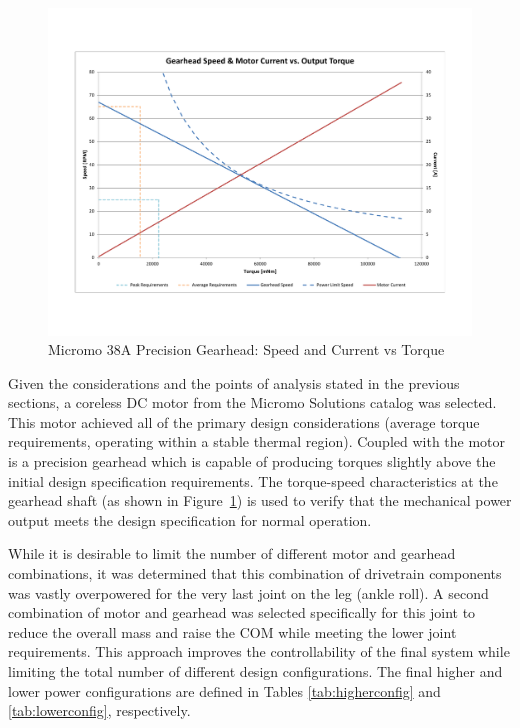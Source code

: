 \begin{figure}[!h]
	\begin{center}
    \includegraphics[trim = 20mm 30mm 20mm 30mm,clip,width=15cm]{fig/design/gearhead1.pdf}
	\end{center}
  \caption{Micromo 38A Precision Gearhead: Speed and Current vs Torque}
  \label{fig:micromo38a}
\end{figure}

Given the considerations and the points of analysis stated in the previous sections, a coreless DC motor from the Micromo Solutions catalog was selected. This motor achieved all of the primary design considerations (average torque requirements, operating within a stable thermal region). Coupled with the motor is a precision gearhead which is capable of producing torques slightly above the initial design specification requirements. The torque-speed characteristics at the gearhead shaft (as shown in Figure~\ref{fig:micromo38a}) is used to verify that the mechanical power output meets the design specification for normal operation. 

While it is desirable to limit the number of different motor and gearhead combinations, it was determined that this combination of drivetrain components was vastly overpowered for the very last joint on the leg (ankle roll). A second combination of motor and gearhead was selected specifically for this joint to reduce the overall mass and raise the COM while meeting the lower joint requirements. This approach improves the controllability of the final system while limiting the total number of different design configurations. The final higher and lower power configurations are defined in Tables \ref{tab:higherconfig} and \ref{tab:lowerconfig}, respectively. 

